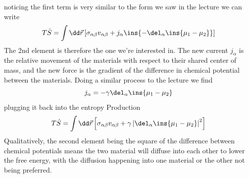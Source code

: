 noticing the first term is very similar to the form we saw in the lecture we can write
\begin{equation}
	T\dot{S} = \int \dd\vec{r} \left[\sigma_{\alpha\beta}v_{\alpha\beta} +j_\alpha\ins{-\del_\alpha\ins{\mu_1-\mu_2}}\right]
\end{equation}
The 2nd element is therefore the one we're interested in. The new current \(j_\alpha\) is the relative movement of the materials with respect to their shared center of mass, and the new force is the gradient of the difference in chemical potential between the materials. Doing a similar process to the lecture we find 
\begin{equation}
	j_\alpha = -\gamma\del_\alpha\ins{\mu_1-\mu_2}
\end{equation}
plugging it back into the entropy Production
\begin{equation}
	T\dot{S} = \int \dd\vec{r} \left[\sigma_{\alpha\beta}v_{\alpha\beta} +\gamma\left\vert\del_\alpha\ins{\mu_1-\mu_2}\right\vert^2\right]
\end{equation}
Qualitatively, the second element being the square of the difference between chemical potentials means the two material will diffuse into each other to lower the free energy, with the diffusion happening into one material or the other not being preferred.